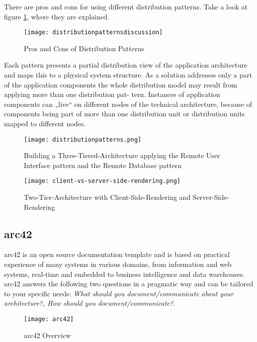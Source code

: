 There are pros and cons for using different distribution patterns. Take a look at figure \ref{fig:dpatternsdiscussion}, where they are explained.

\begin{figure}[H]
  \center
  \texttt{[image: distributionpatternsdiscussion]}
  \caption{Pros and Cons of Distribution Patterns}
  \label{fig:dpatternsdiscussion}
\end{figure}

Each pattern presents a partial distribution view of the application architecture and maps this to a physical system structure. As a solution addresses only a part of the application components the whole distribution model may result from applying more than one distribution pat- tern. Instances of application components can „live“ on different nodes of the technical architecture, because of components being part of more than one distribution unit or distribution units mapped to different nodes.

\begin{figure}[H]
  \center
  \texttt{[image: distributionpatterns.png]}
  \caption{Building a Three-Tiered-Architecture applying the Remote User Interface pattern and the Remote Database pattern}
\end{figure}

\begin{figure}[H]
  \center
  \texttt{[image: client-vs-server-side-rendering.png]}
  \caption{Two-Tier-Architecture with Client-Side-Rendering and Server-Side-Rendering}
\end{figure}

\subsection{arc42}
arc42 is an open source documentation template and is based on practical experience of many systems in various domains, from information and web systems, real-time and embedded to business intelligence and data warehouses. arc42 answers the following two questions in a pragmatic way and can be tailored to your specific needs: \textit{What should you document/communicate about your architecture?,  How should you document/communicate?}.

\begin{figure}[H]
  \center
  \texttt{[image: arc42]}
  \caption{arc42 Overview}
\end{figure}
